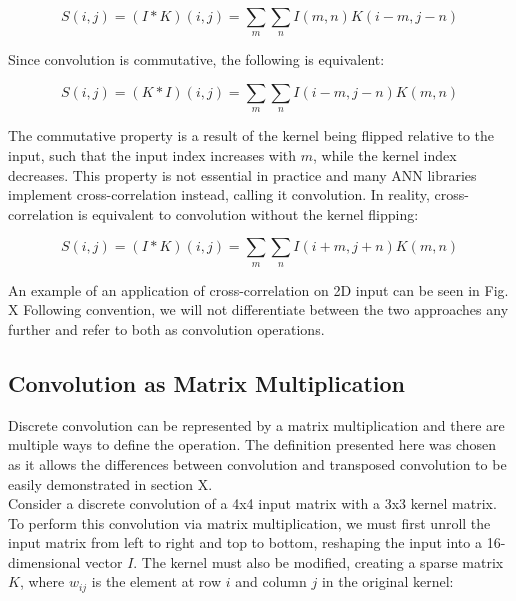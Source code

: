 \[ S(i, j) = (I*K)(i, j) = \sum_{m} \sum_{n} I(m, n) K(i-m, j-n) \]

\noindent Since convolution is commutative, the following is equivalent:

\[ S(i, j) = (K*I)(i, j) = \sum_{m} \sum_{n} I(i-m, j-n) K(m, n) \]

\noindent The commutative property is a result of the kernel being flipped relative to the input, such that the input index increases with $m$, while the kernel index decreases. This property is not essential in practice and many ANN libraries implement cross-correlation instead, calling it convolution. In reality, cross-correlation is equivalent to convolution without the kernel flipping:

\[ S(i, j) = (I*K)(i, j) = \sum_{m} \sum_{n} I(i+m, j+n) K(m, n) \]

\noindent An example of an application of cross-correlation on 2D input can be seen in Fig. X Following convention, we will not differentiate between the two approaches any further and refer to both as convolution operations. 
 
\subsection{Convolution as Matrix Multiplication} \label{conv-matrix}
 
Discrete convolution can be represented by a matrix multiplication and there are multiple ways to define the operation. The definition presented here was chosen as it allows the differences between convolution and transposed convolution to be easily demonstrated in section X. \\

\noindent Consider a discrete convolution of a 4x4 input matrix with a 3x3 kernel matrix. To perform this convolution via matrix multiplication, we must first unroll the input matrix from left to right and top to bottom, reshaping the input into a 16-dimensional vector $I$. The kernel must also be modified, creating a sparse matrix $K$, where $w_{ij}$ is the element at row $i$ and column $j$ in the original kernel:


